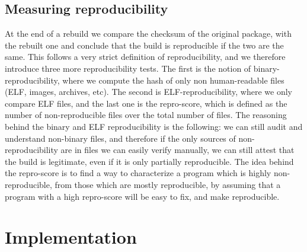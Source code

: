 \documentclass[a4paper,11pt,oneside]{report}
\theoremstyle{definition}
\begin{document}
\section{Measuring reproducibility}
At the end of a rebuild we compare the checksum of the original package, with
the rebuilt one and conclude that the build is reproducible if the two are the
same. This follows a very strict definition of reproducibility, and we
therefore introduce three more reproducibility tests. The first is the notion
of binary-reproducibility, where we compute the hash of only non human-readable
files (ELF, images, archives, etc). The second is ELF-reproducibility, where we
only compare ELF files, and the last one is the repro-score, which is defined
as the number of non-reproducible files over the total number of files. The
reasoning behind the binary and ELF reproducibility is the following: we can
still audit and understand non-binary files, and therefore if the only sources
of non-reproducibility are in files we can easily verify manually, we can still
attest that the build is legitimate, even if it is only partially reproducible.
The idea behind the repro-score is to find a way to characterize a program
which is highly non-reproducible, from those which are mostly reproducible, by
assuming that a program with a high repro-score will be easy to fix, and make
reproducible.



\chapter{Implementation}
\end{document}
